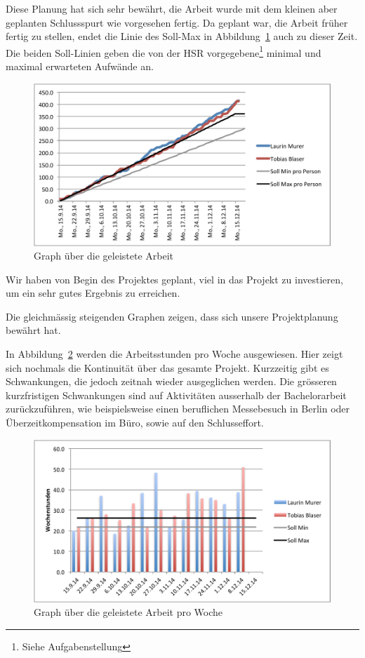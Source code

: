 	Diese Planung hat sich sehr bewährt, die Arbeit wurde mit dem kleinen aber geplanten Schlussspurt wie vorgesehen fertig.
	Da geplant war, die Arbeit früher fertig zu stellen, endet die Linie des Soll-Max in Abbildung~\ref{fig:workGraph} auch zu dieser Zeit.
	Die beiden Soll-Linien geben die von der HSR vorgegebene\footnote{Siehe Aufgabenstellung} minimal und maximal erwarteten Aufwände an.
	
	\begin{figure}[H]
		\includegraphics[width=\textwidth]{projectPlan/media/img/workGraph.pdf}
		\centering
		\caption{Graph über die geleistete Arbeit}
		\label{fig:workGraph}
	\end{figure}
	
	Wir haben von Begin des Projektes geplant, viel in das Projekt zu investieren, um ein sehr gutes Ergebnis zu erreichen.
	
	Die gleichmässig steigenden Graphen zeigen, dass sich unsere Projektplanung bewährt hat.
	
	In Abbildung~\ref{fig:weekhours} werden die Arbeitsstunden pro Woche ausgewiesen.
	Hier zeigt sich nochmals die Kontinuität über das gesamte Projekt.
	Kurzzeitig gibt es Schwankungen, die jedoch zeitnah wieder ausgeglichen werden.
	Die grösseren kurzfristigen Schwankungen sind auf Aktivitäten ausserhalb der Bachelorarbeit zurückzuführen,
	wie beispielsweise einen beruflichen Messebesuch in Berlin oder Überzeitkompensation im Büro,
	sowie auf den Schluss\-effort.

	\begin{figure}[H]
		\includegraphics[width=\textwidth]{projectPlan/media/img/weekhours.pdf}
		\centering
		\caption{Graph über die geleistete Arbeit pro Woche}
		\label{fig:weekhours}
	\end{figure}

